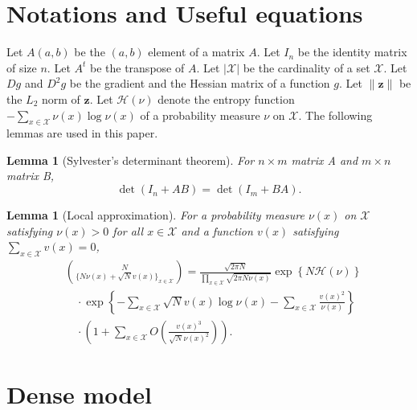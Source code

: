 \documentclass[conference,twocolumns]{IEEEtran}
\theoremstyle{plain}
\newtheorem{lemma}[theorem]{Lemma}
\begin{document}
\section{Notations and Useful equations}
Let $A(a,b)$ be the $(a,b)$ element of a matrix $A$.
Let $I_n$ be the identity matrix of size $n$.
Let $A^t$ be the transpose of $A$.
Let $|\mathcal{X}|$ be the cardinality of a set $\mathcal{X}$.
Let $Dg$ and $D^2g$ be the gradient and the Hessian matrix of a function $g$.
Let $\|\bm{z}\|$ be the $L_2$ norm of $\bm{z}$.
Let $\mathcal{H}(\nu)$ denote the entropy function $-\sum_{x\in\mathcal{X}}\nu(x)\log \nu(x)$ of a probability measure $\nu$ on $\mathcal{X}$.
The following lemmas are used in this paper.
\begin{lemma}[Sylvester's determinant theorem]\label{lem:sylvester}
For $n\times m$ matrix A and $m\times n$ matrix B,
\begin{equation*}
\det(I_n + AB) = \det(I_m + BA).
\end{equation*}
\end{lemma}
\begin{lemma}[Local approximation]\label{lem:local}
For a probability measure $\nu(x)$ on $\mathcal{X}$ satisfying $\nu(x)>0$ for all $x\in\mathcal{X}$
 and a function $v(x)$ satisfying $\sum_{x\in\mathcal{X}} v(x) = 0$,
\begin{align*}
&\binom{N}{\{N\nu(x) + \sqrt{N}v(x)\}_{x\in\mathcal{X}}}=
\frac{\sqrt{2\pi N}}{\prod_{x\in\mathcal{X}} \sqrt{2\pi N\nu(x)}}
\exp\left\{N\mathcal{H}(\nu)\right\}\\
&\quad\cdot \exp\left\{-\sum_{x\in\mathcal{X}}\sqrt{N}v(x)\log \nu(x)
-\sum_{x\in\mathcal{X}}\frac{v(x)^2}{\nu(x)}
\right\}\\
&\quad\cdot \left(1 +\sum_{x\in\mathcal{X}}O\left(\frac{v(x)^3}{\sqrt{N}\nu(x)^2}\right)\right).
\end{align*}
\end{lemma}

\section{Dense model}
\end{document}
